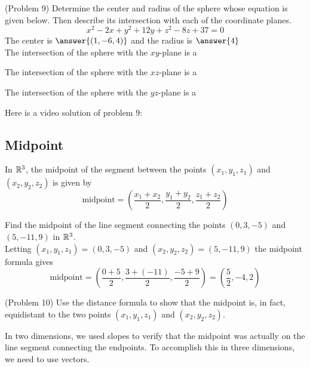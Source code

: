 \documentclass[handout]{ximera}
\begin{document}
\begin{problem}(Problem 9)
Determine the center and radius of the sphere whose equation is given below.  
Then describe its intersection with each of the coordinate planes.
\[
x^2 - 2x + y^2 + 12y + z^2 - 8z +37 = 0
\]
The center is $\answer{(1, -6, 4)}$ and the radius is $\answer{4}$\\
The intersection of the sphere with the $xy$-plane is a 
\begin{multipleChoice}
\end{multipleChoice}

The intersection of the sphere with the $xz$-plane is a 
\begin{multipleChoice}
\end{multipleChoice}

The intersection of the sphere with the $yz$-plane is a 
\begin{multipleChoice}
\end{multipleChoice}

\end{problem}


Here is a video solution of problem 9:\\
\begin{foldable}
\end{foldable}

\subsection{Midpoint}
In $\mathbb R^3$, the midpoint of the segment between the points $(x_1, y_1, z_1)$ and $(x_2, y_2, z_2)$ is given by 
\[
\text{midpoint} = \left(\frac{x_1 + x_2}{2}, \frac{y_1 + y_2}{2}, \frac{z_1 + z_2}{2}\right)
\]

\begin{example}[Example 10]
Find the midpoint of the line segment connecting the points $(0,3,-5)$ and $(5,-11,9)$ in $\mathbb R^3$.\\
Letting $(x_1, y_1, z_1) = (0,3,-5)$ and $(x_2, y_2, z_2) = (5,-11,9)$ the midpoint formula gives
\[
\text{midpoint} = \left(\frac{0+5}{2}, \frac{3+(-11)}{2}, \frac{-5+9}{2}\right) = \left(\frac{5}{2}, -4,2\right)
\]
\end{example}

\begin{problem}(Problem 10)
Use the distance formula to show that the midpoint is, in fact, 
equidistant to the two points $(x_1, y_1, z_1)$ and $(x_2, y_2, z_2)$.
\end{problem}



In two dimensions, we used slopes to verify that the midpoint was actually on the line segment connecting the endpoints.  
To accomplish this in three dimensions, we need to use vectors.
\end{document}
